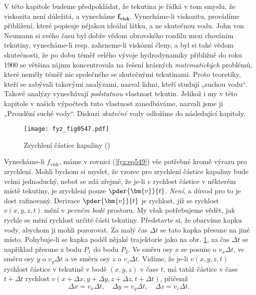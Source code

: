     V této kapitole budeme předpokládat, že tekutina je řídká v tom smyslu, že viskozita není 
    důležitá, a vynecháme \(\bm{f_{\text{visk}}}\). Vynecháme-li viskozitu, provádíme 
    přiblížení, které popisuje nějakou ideální látku, a ne skutečnou vodu. John von Neumann si 
    svého času byl dobře vědom obrovského rozdílu mezi chováním tekutiny, vynecháme-li resp. 
    zahrneme-li viskózní členy, a byl si také vědom skutečnosti, že po dobu téměř celého vývoje 
    hydrodynamiky přibližně do roku \num{1900} se většina zájmu koncentrovala na řešení krásných 
    \emph{matematických} problémů, které neměly téměř nic společného se skutečnými tekutinami. 
    Proto teoretiky, kteří se zabývali takovými analýzami, nazval lidmi, kteří studují „suchou 
    vodu“. Takové analýzy vynechávají \emph{podstatnou} vlastnost tekutin. Jelikož i my v této 
    kapitole v našich výpočtech tuto vlastnost zanedbáváme, nazvali jsme ji „Proudění suché vody“. 
    Diskuzi \emph{skutečné} vody odložíme do následující kapitoly.
    
    \begin{figure}[ht!] %
      \centering
      \texttt{[image: fyz\_fig0547.pdf]}
      \caption{Zrychlení částice kapaliny
               (\cite[s.~744]{Feynman02})}
      \label{fyz:fig0547}
    \end{figure}
    
    Vynecháme-li \(f_{\text{visk}}\), máme v rovnici (\ref{fyz:eq549}) vše potřebné kromě výrazu 
    pro zrychlení. Mohli bychom si myslet, že vzorec pro zrychlení částice kapaliny bude velmi 
    jednoduchý, neboť se zdá zřejmé, že je-li \(v\) rychlost částice v některém místě tekutiny, je 
    zrychlení pouze \(\pder{\bm{v}}{t}\). \emph{Není}, a důvod pro to je dost rafinovaný. Derivace 
    \(\pder{\bm{v}}{t}\) je rychlost, jíž se rychlost \(v(x, y, z, t)\) mění v \emph{pevném bodě} 
    prostoru. My však potřebujeme vědět, jak rychle se mění rychlost určité části tekutiny. 
    Představte si, že obarvíme kapku vody, abychom ji mohli pozorovat. Za malý čas \(\Delta t\) se 
    tato kapka přesune na jiné místo. Pohybuje-li se kapka podél nějaké trajektorie jako na obr. 
    \ref{fyz:fig0547}, za čas \(\Delta t\) se například přesune z bodu \(P_1\) do bodu \(P_2\). Ve 
    směru osy \(x\) se posune o \(v_x\Delta t\), ve směru osy \(y\) o \(v_y\Delta t\) a ve směru 
    osy \(z\) o \(v_z\Delta t\). Vidíme, že je-li \(v(x, y, z, t)\) rychlost částice v tekutině v 
    bodě \((x, y, z)\) v čase \(t\), má tatáž částice v čase \(t + \Delta t\) rychlost \(v(x+ 
    \Delta x, y + \Delta y, z + \Delta z, t + \Delta t)\), přičemž
    \begin{equation*}
      \Delta x = v_x\Delta t, \quad  \Delta y = v_y\Delta t, \quad  \Delta z = v_z\Delta t.
    \end{equation*}
    

